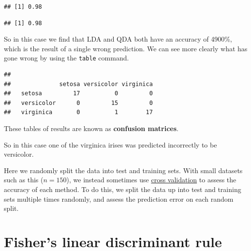 \documentclass[
]{book}
\newenvironment{Shaded}{\begin{snugshade}}{\end{snugshade}}
\newcommand{\DecValTok}[1]{\textcolor[rgb]{0.00,0.00,0.81}{#1}}
\newcommand{\FunctionTok}[1]{\textcolor[rgb]{0.13,0.29,0.53}{\textbf{#1}}}
\newcommand{\NormalTok}[1]{#1}
\newcommand{\OtherTok}[1]{\textcolor[rgb]{0.56,0.35,0.01}{#1}}
\newcommand{\SpecialCharTok}[1]{\textcolor[rgb]{0.81,0.36,0.00}{\textbf{#1}}}
\theoremstyle{definition}
\theoremstyle{definition}
\theoremstyle{definition}
\theoremstyle{definition}
\theoremstyle{remark}
\begin{document}
\begin{verbatim}
## [1] 0.98
\end{verbatim}

\begin{Shaded}
\end{Shaded}

\begin{verbatim}
## [1] 0.98
\end{verbatim}

So in this case we find that LDA and QDA both have an accuracy of 4900\%, which is the result of a single wrong prediction. We can see more clearly what has gone wrong by using the \texttt{table} command.

\begin{Shaded}
\end{Shaded}

\begin{verbatim}
##             
##              setosa versicolor virginica
##   setosa         17          0         0
##   versicolor      0         15         0
##   virginica       0          1        17
\end{verbatim}

These tables of results are known as \textbf{confusion matrices}.

So in this case one of the virginica irises was predicted incorrectly to be versicolor.

Here we randomly split the data into test and training sets. With small datasets such as this (\(n=150\)), we instead sometimes use \href{https://en.wikipedia.org/wiki/Cross-validation_(statistics)}{cross validation} to assess the accuracy of each method. To do this, we split the data up into test and training sets multiple times randomly, and assess the prediction error on each random split.

\section{Fisher's linear discriminant rule}\label{FLDA}
\end{document}
